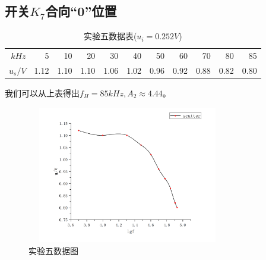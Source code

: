 \documentclass[a4 paper,12pt]{article}
\begin{document}
    \subsection{开关$K_{7}$合向“0”位置}
                 \begin{table}[H]
    	\centering
    	\caption{实验五数据表($u_{i}=0.252V$)}
    	\label{实验五数据表}
    	\begin{tabular}{|r|r|r|r|r|r|r|r|r|r|r|}
    		\toprule[0.5mm]
    		$kHz$&5&10&20&30&40&50&60&70&80&85\\
    		$u_{s}/V$&1.12&1.10&1.10&1.06&1.02&0.96&0.92&0.88&0.82&0.80\\
    		\bottomrule[0.5mm]
    	\end{tabular}
    \end{table}
    \par 我们可以从上表得出$f_{H}=85kHz,A_{2}\approx 4.44$。
    		\begin{figure}[H]
    	\centering
    	\includegraphics[width=8.8cm,height=6cm]  {实验五.png} 
    	\caption{\label{1} 实验五数据图}
    \end{figure}
\end{document}
